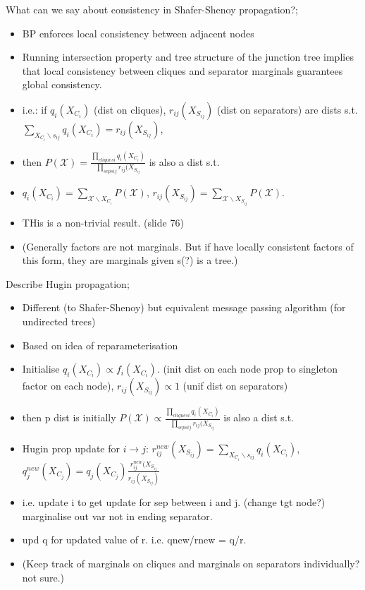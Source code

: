 \documentclass{article}
\begin{document}
What can we say about consistency in Shafer-Shenoy propagation?; \begin{itemize} \item BP enforces local consistency between adjacent nodes \item Running intersection property and tree structure of the junction tree implies that local consistency between cliques and separator marginals guarantees global consistency.  \item i.e.: if $q_i(X_{C_i})$ (dist on cliques), $r_{ij}(X_{S_{ij}})$ (dist on separators) are dists s.t. $\sum_{X_{C_i}\backslash s_{ij}}q_i(X_{C_i})=r_{ij}(X_{S_{ij}})$, \item then $P(\mathcal{X})=\frac{\prod_{cliques i}q_i(X_{C_i})}{\prod_{seps ij}r_{ij}(X_{S_{ij}}}$ is also a dist s.t.  \item $q_i(X_{C_i})=\sum_{\mathcal{X}\backslash X_{C_i}}P(\mathcal{X})$, $r_{ij}(X_{S_{ij}})=\sum_{\mathcal{X}\backslash X_{S_{ij}}}P(\mathcal{X})$.  \item THis is a non-trivial result. (slide 76) \item (Generally factors are not marginals. But if have locally consistent factors of this form, they are marginals given s(?) is a tree.) \end{itemize}

Describe Hugin propagation; \begin{itemize} \item Different (to Shafer-Shenoy) but equivalent message passing algorithm (for undirected trees) \item Based on idea of reparameterisation \item Initialise $q_i(X_{C_i})\propto f_i(X_{C_i})$. (init dist on each node prop to singleton factor on each node), $r_{ij}(X_{S_{ij}})\propto 1$ (unif dist on separators) \item then p dist is initially $P(\mathcal{X})\propto\frac{\prod_{cliques i}q_i(X_{C_i})}{\prod_{seps ij}r_{ij}(X_{S_{ij}}}$ is also a dist s.t.  \item Hugin prop update for $i\rightarrow j$: $r_{ij}^{new}(X_{S_{ij}})=\sum_{X_{C_i}\backslash s_{ij}}q_i(X_{C_i})$, $q_j^{new}(X_{C_j})=q_j(X_{C_j})\frac{r_{ij}^{new}(X_{S_{ij}}}{r_{ij}(X_{S_{ij}})}$ \item i.e. update i to get update for sep between i and j. (change tgt node?) marginalise out var not in ending separator.  \item upd q for updated value of r. i.e. qnew/rnew = q/r.  \item (Keep track of marginals on cliques and marginals on separators individually? not sure.) \end{itemize} 
\end{document}
